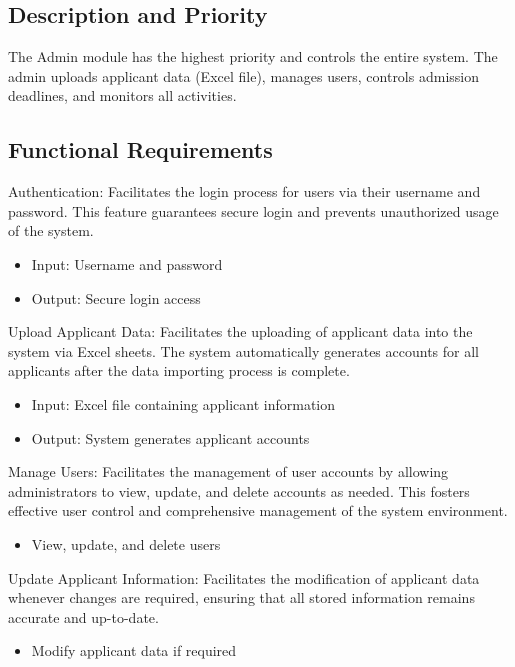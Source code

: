 \subsection{Description and Priority}
The Admin module has the highest priority and controls the entire system. The admin uploads applicant data (Excel file), manages users, controls admission deadlines, and monitors all activities.

\subsection{Functional Requirements}

\noindent Authentication:
Facilitates the login process for users via their username and password. This feature guarantees secure login and prevents unauthorized usage of the system.
\begin{itemize}
    \item Input: Username and password
    \item Output: Secure login access
\end{itemize}

\vspace{0.2cm}
\noindent Upload Applicant Data:
Facilitates the uploading of applicant data into the system via Excel sheets. The system automatically generates accounts for all applicants after the data importing process is complete.
\begin{itemize}
    \item Input: Excel file containing applicant information
    \item Output: System generates applicant accounts
\end{itemize}

\vspace{0.2cm}
\noindent Manage Users:
Facilitates the management of user accounts by allowing administrators to view, update, and delete accounts as needed. This fosters effective user control and comprehensive management of the system environment.
\begin{itemize}
    \item View, update, and delete users
\end{itemize}

\vspace{0.2cm}
\noindent Update Applicant Information:
Facilitates the modification of applicant data whenever changes are required, ensuring that all stored information remains accurate and up-to-date.
\begin{itemize}
    \item Modify applicant data if required
\end{itemize}

